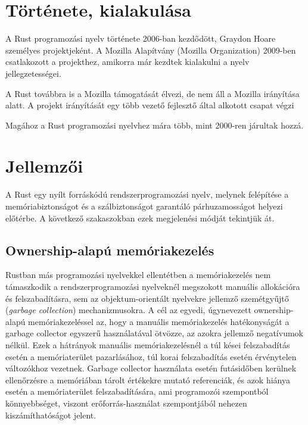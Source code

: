 
\section{Története, kialakulása}

A Rust programozási nyelv története 2006-ban kezdődött, Graydon Hoare személyes projektjeként. A Mozilla Alapítvány (Mozilla Organization) 2009-ben csatlakozott a projekthez, amikorra már kezdtek kialakulni a nyelv jellegzetességei.


A Rust továbbra is a Mozilla támogatását élvezi, de nem áll a Mozilla irányítása alatt. A projekt irányítását egy több vezető fejlesztő által alkotott csapat végzi


Magához a Rust programozási nyelvhez mára több, mint 2000-ren járultak hozzá.


\section{Jellemzői}

A Rust egy nyílt forráskódú rendszerprogramozási nyelv, melynek felépítése a memóriabiztonságot és a szálbiztonságot garantáló párhuzamosságot helyezi előtérbe. A következő szakaszokban ezek megjelenési módját tekintjük át.
 
\subsection{Ownership-alapú memóriakezelés}

Rustban más programozási nyelvekkel ellentétben a memóriakezelés nem támaszkodik a rendszerprogramozási nyelveknél megszokott manuális allokációra és felszabadításra, sem az objektum-orientált nyelvekre jellemző szemétgyűjtő (\textit{garbage collection}) mechanizmusokra. A cél az egyedi, úgynevezett ownership-alapú memóriakezeléssel az, hogy a manuális memóriakezelés hatékonyságát a garbage collector egyszerű használatával ötvözze, az azokra jellemző negatívumok nélkül. Ezek a hátrányok manuális memóriakezelésnél a túl kései felszabadítás esetén a memóriaterület pazarlásához, túl korai felszabadítás esetén érvénytelen változókhoz vezetnek. Garbage collector használata esetén futásidőben kerülnek ellenőrzésre a memóriában tárolt értékekre mutató referenciák, és azok hiánya esetén a memóriaterület felszabadítására, ami programozói szempontból könnyebbséget, viszont erőforrás-használat szempontjából nehezen kiszámíthatóságot jelent.

